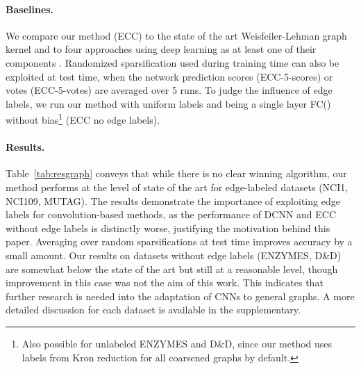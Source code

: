 \documentclass[10pt,twocolumn,letterpaper]{article}
\begin{document}
\paragraph*{Baselines.}
We compare our method (ECC) to the state of the art Weisfeiler-Lehman graph kernel \etal \cite{shervashidze} and to four approaches using deep learning as at least one of their components \cite{dcnn, niepert, deepkern, struct2vec}. Randomized sparsification used during training time can also be exploited at test time, when the network prediction scores (ECC-5-scores) or votes (ECC-5-votes) are averaged over 5 runs. To judge the influence of edge labels, we run our method with uniform labels and  being a single layer FC() without bias\footnote{Also possible for unlabeled ENZYMES and D{\&}D, since our method uses labels from Kron reduction for all coarsened graphs by default.} (ECC no edge labels). 

\paragraph*{Results.}
Table~\ref{tab:resgraph} conveys that while there is no clear winning algorithm, our method performs at the level of state of the art for edge-labeled datasets (NCI1, NCI109, MUTAG). The results demonstrate the importance of exploiting edge labels for convolution-based methods, as the performance of DCNN \cite{dcnn} and ECC without edge labels is distinctly worse, justifying the motivation behind this paper. Averaging over random sparsifications at test time improves accuracy by a small amount. Our results on datasets without edge labels (ENZYMES, D{\&}D) are somewhat below the state of the art but still at a reasonable level, though improvement in this case was not the aim of this work. This indicates that further research is needed into the adaptation of CNNs to general graphs. A more detailed discussion for each dataset is available in the supplementary.



\begin{table}[bt]
\centering
\addtolength{\tabcolsep}{-3pt}
\addtolength{\tabcolsep}{3pt}
\vspace{1.5ex}
\caption{\label{tab:stats}
Characteristics of the graph benchmark datasets, extended from \cite{struct2vec}. Both edge and vertex labels are categorical.}
\end{table}
\end{document}
